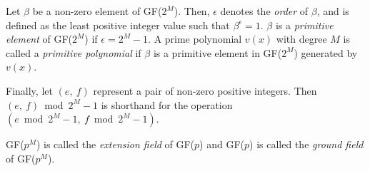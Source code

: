 Let $\beta$ be a non-zero element of GF($2^M$). Then, $\epsilon$ denotes the \textit{order} of $\beta$, and is defined as the least positive integer value such that $\beta^{\epsilon}=1$. $\beta$ is a \textit{primitive element} of GF($2^M$) if $\epsilon=2^M-1$. A prime polynomial $v(x)$ with degree $M$ is called a \textit{primitive polynomial} if $\beta$ is a primitive element in GF($2^M$) generated by $v(x)$. 

Finally, let $(e,~f)$ represent a pair of non-zero positive integers. Then $(e,~f) \bmod 2^M-1$ is shorthand for the operation $(e \bmod 2^M-1,~f \bmod 2^M-1)$.

 GF($p^M$) is called the \textit{extension field} of GF($p$) and GF($p$) is called the \textit{ground field} of GF($p^M$).







